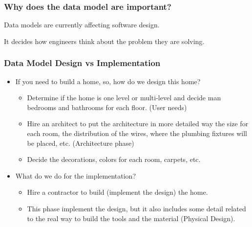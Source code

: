
\begin{frame}
    \frametitle{Why does the data model are important?}
    \begin{wideitemize}
        \item Data models are currently affecting software design.
        \item It decides how engineers think about the problem they are solving.
    \end{wideitemize}
\end{frame}

\begin{frame}
    \frametitle{Data Model Design vs Implementation}
    \begin{itemize}[<+->]
        \item If you need to build a home, so, how do we design this home?
        \begin{itemize}[<+->]
            \item Determine if the home is one level or multi-level and decide man bedrooms and bathrooms for each floor. (User needs)
            \item Hire an architect to put the architecture in more detailed way \forexample the size for each room, the distribution of the wires, where the plumbing fixtures will be placed, etc. (Architecture phase)
            \item Decide the decorations, colors for each room, carpets, etc.
        \end{itemize}
        \item What do we do for the implementation?
        \begin{itemize}[<+->]
            \item Hire a contractor to build (implement the design) the home.
            \item This phase implement the design, but it also includes some detail related to the real way to build the tools and the material (Physical Design).
        \end{itemize}
    \end{itemize}
\end{frame}

